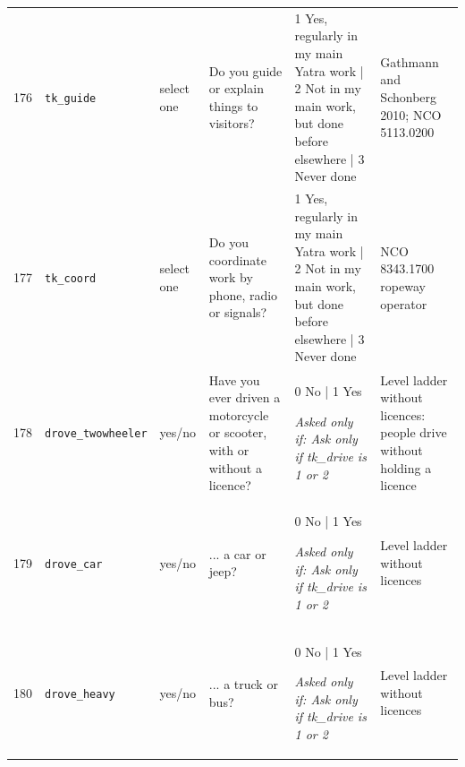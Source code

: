 \documentclass[9pt,a4paper,landscape]{article}
\begin{document}
\begin{longtable}{@{}p{0.5cm}p{3.3cm}p{1.7cm}p{7.3cm}p{5.6cm}p{5.4cm}@{}}
\footnotesize 176 & \footnotesize\texttt{tk\_guide} & \scriptsize select one & \footnotesize Do you guide or explain things to visitors? \par\vspace{1pt}{\footnotesize\color{hdr}{\hifont क्या आप आने वालों को रास्ता या बात समझाना का काम करते हैं? (1 अपने मुख्य यात्रा-काम में नियमित; 2 मुख्य काम में नहीं, पर पहले कहीं और किया है; 3 कभी नहीं)}} & \scriptsize 1 Yes, regularly in my main Yatra work | 2 Not in my main work, but done before elsewhere | 3 Never done & \scriptsize Gathmann and Schonberg 2010; NCO 5113.0200\\
\footnotesize 177 & \footnotesize\texttt{tk\_coord} & \scriptsize select one & \footnotesize Do you coordinate work by phone, radio or signals? \par\vspace{1pt}{\footnotesize\color{hdr}{\hifont क्या आप फ़ोन, रेडियो या इशारों से दूसरों के साथ तालमेल करना का काम करते हैं? (1 अपने मुख्य यात्रा-काम में नियमित; 2 मुख्य काम में नहीं, पर पहले कहीं और किया है; 3 कभी नहीं)}} & \scriptsize 1 Yes, regularly in my main Yatra work | 2 Not in my main work, but done before elsewhere | 3 Never done & \scriptsize NCO 8343.1700 ropeway operator\\
\footnotesize 178 & \footnotesize\texttt{drove\_twowheeler} & \scriptsize yes/no & \footnotesize Have you ever driven a motorcycle or scooter, with or without a licence?\par\vspace{1pt}{\footnotesize\color{hdr}{\hifont क्या आपने कभी मोटरसाइकिल या स्कूटर चलाई है, लाइसेंस हो या न हो?}} & \scriptsize 0 No | 1 Yes\par\vspace{1pt}\textit{Asked only if: Ask only if tk\_drive is 1 or 2} & \scriptsize Level ladder without licences: people drive without holding a licence\\
\footnotesize 179 & \footnotesize\texttt{drove\_car} & \scriptsize yes/no & \footnotesize ... a car or jeep?\par\vspace{1pt}{\footnotesize\color{hdr}{\hifont ...कार या जीप?}} & \scriptsize 0 No | 1 Yes\par\vspace{1pt}\textit{Asked only if: Ask only if tk\_drive is 1 or 2} & \scriptsize Level ladder without licences\\
\footnotesize 180 & \footnotesize\texttt{drove\_heavy} & \scriptsize yes/no & \footnotesize ... a truck or bus?\par\vspace{1pt}{\footnotesize\color{hdr}{\hifont ...ट्रक या बस?}} & \scriptsize 0 No | 1 Yes\par\vspace{1pt}\textit{Asked only if: Ask only if tk\_drive is 1 or 2} & \scriptsize Level ladder without licences\\

\end{longtable}
\end{document}
